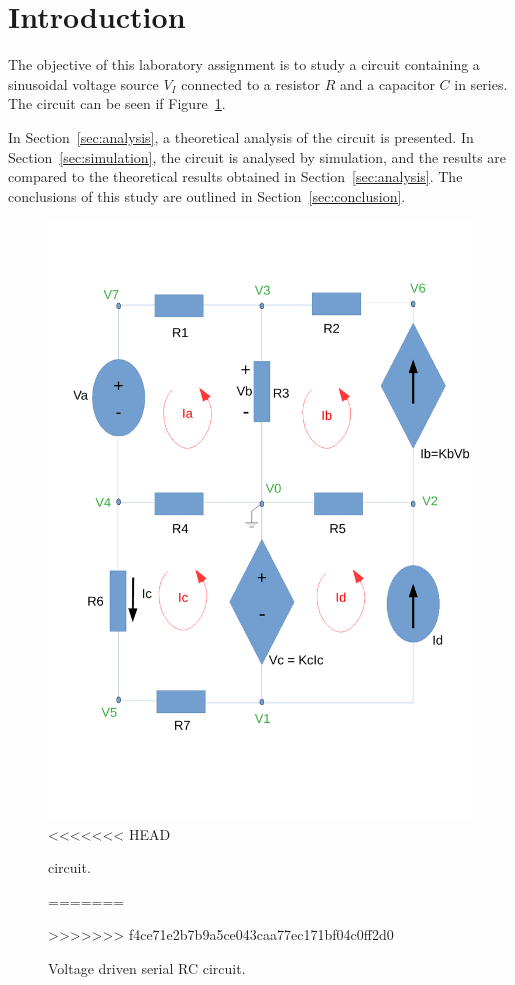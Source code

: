 \section{Introduction}
\label{sec:introduction}

The objective of this laboratory assignment is to study a circuit containing a
sinusoidal voltage source $V_I$ connected to a resistor $R$ and a capacitor $C$
in series. The circuit can be seen if Figure~\ref{fig:rc}.


In Section~\ref{sec:analysis}, a theoretical analysis of the circuit is
presented. In Section~\ref{sec:simulation}, the circuit is analysed by
simulation, and the results are compared to the theoretical results obtained in
Section~\ref{sec:analysis}. The conclusions of this study are outlined in
Section~\ref{sec:conclusion}.

\begin{figure}[ht] \centering
    \includegraphics[width=0.4\linewidth]{circuito_tcfe.pdf}
<<<<<<< HEAD
    \caption{circuit.}
=======
    \caption{Voltage driven serial RC circuit.}
>>>>>>> f4ce71e2b7b9a5ce043caa77ec171bf04c0ff2d0
    \label{fig:rc}
\end{figure}

